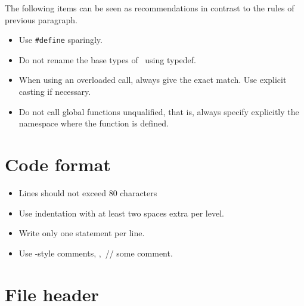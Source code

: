 The following items can be seen as recommendations
in contrast to the rules of previous paragraph.

\begin{itemize}
\item Use \verb|#define| sparingly.
\item Do not rename the base types of \CC\ using {\ccFont typedef}.
\item When using an overloaded call, always give the exact match. Use
  explicit casting if necessary.
\item Do not call global functions unqualified, that is, always
  specify explicitly the namespace where the function is defined.
\end{itemize}


\section{Code format\label{sec:code_format}}

\begin{itemize}
\item Lines should not exceed 80 characters
\item Use indentation with at least two spaces extra per level.%
\item Write only one statement per line.
\item Use \CC-style comments, \eg,~{\ccFont // some comment}.%
\end{itemize}


\section{File header\label{sec:file_header}}

